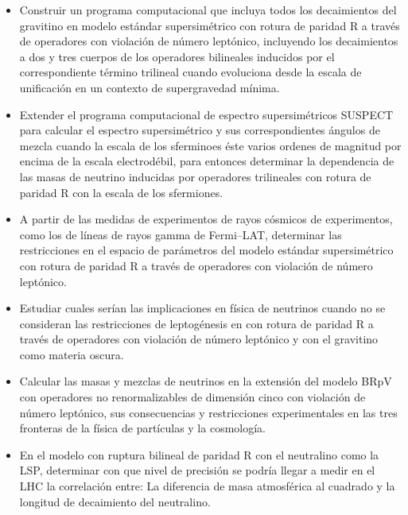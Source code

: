 \begin{itemize}
\item 
\begin{gravitinodm}
  Construir un programa computacional que incluya todos los
  decaimientos del gravitino en modelo estándar supersimétrico con
  rotura de paridad R a través de operadores con violación de número
  leptónico, incluyendo los decaimientos a dos y tres cuerpos de los
  operadores bilineales inducidos por el correspondiente término
  trilineal cuando evoluciona desde la escala de unificación en un
  contexto de supergravedad mínima.
\end{gravitinodm}

\item 
\begin{gravitinodm}
  Extender el programa computacional de espectro supersimétricos
  SUSPECT~\cite{a} para calcular el espectro supersimétrico y sus
  correspondientes ángulos de mezcla cuando la escala de los
  sferminoes éste varios ordenes de magnitud por encima de la escala
  electrodébil, para entonces determinar la dependencia de las masas
  de neutrino inducidas por operadores trilineales con rotura de
  paridad R con la escala de los sfermiones.
\end{gravitinodm}


\item 
\begin{gravitinodm}
  A partir de las medidas de experimentos de rayos cósmicos de
  experimentos, como los de líneas de rayos gamma de Fermi--LAT,
  determinar las restricciones en el espacio de parámetros del modelo
  estándar supersimétrico con rotura de paridad R a través de
  operadores con violación de número leptónico.
\end{gravitinodm}

\item
\begin{gravitinodm}
  Estudiar cuales serían las implicaciones en física de neutrinos
  cuando no se consideran las restricciones de leptogénesis en con
  rotura de paridad R a través de operadores con violación de número
  leptónico y con el gravitino como materia oscura.
\end{gravitinodm}

\item 
\begin{bbrpvlhc}
  Calcular las masas y mezclas de neutrinos en la extensión del modelo
  BRpV con operadores no renormalizables de dimensión cinco con
  violación de número leptónico, sus consecuencias y restricciones
  experimentales en las tres fronteras de la física de partículas y la
  cosmología.
\end{bbrpvlhc}
\item 
\begin{brpvlhc}  
  En el modelo con ruptura bilineal de paridad R con el neutralino
  como la LSP, determinar con que nivel de precisión se podría llegar
  a medir en el LHC la correlación entre: La diferencia de masa
  atmosférica al cuadrado y la longitud de decaimiento del neutralino.
\end{brpvlhc}


\end{itemize}
